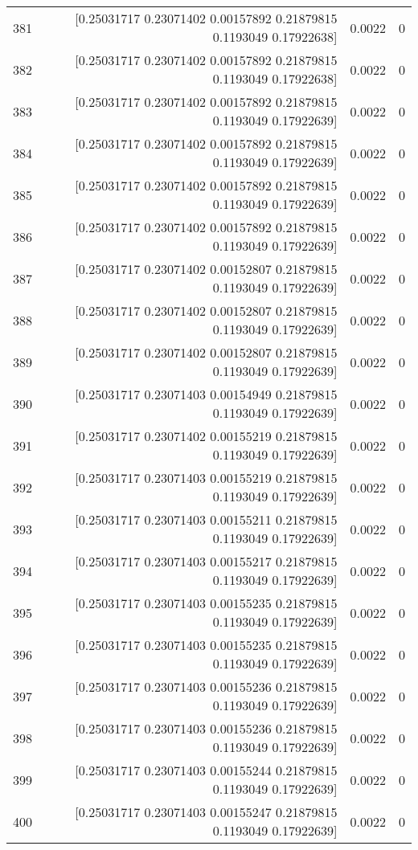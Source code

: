 \begin{longtable}{lrrr}
381 & [0.25031717 0.23071402 0.00157892 0.21879815 0.1193049  0.17922638] & 0.0022 & 0 \\
382 & [0.25031717 0.23071402 0.00157892 0.21879815 0.1193049  0.17922638] & 0.0022 & 0 \\
383 & [0.25031717 0.23071402 0.00157892 0.21879815 0.1193049  0.17922639] & 0.0022 & 0 \\
384 & [0.25031717 0.23071402 0.00157892 0.21879815 0.1193049  0.17922639] & 0.0022 & 0 \\
385 & [0.25031717 0.23071402 0.00157892 0.21879815 0.1193049  0.17922639] & 0.0022 & 0 \\
386 & [0.25031717 0.23071402 0.00157892 0.21879815 0.1193049  0.17922639] & 0.0022 & 0 \\
387 & [0.25031717 0.23071402 0.00152807 0.21879815 0.1193049  0.17922639] & 0.0022 & 0 \\
388 & [0.25031717 0.23071402 0.00152807 0.21879815 0.1193049  0.17922639] & 0.0022 & 0 \\
389 & [0.25031717 0.23071402 0.00152807 0.21879815 0.1193049  0.17922639] & 0.0022 & 0 \\
390 & [0.25031717 0.23071403 0.00154949 0.21879815 0.1193049  0.17922639] & 0.0022 & 0 \\
391 & [0.25031717 0.23071402 0.00155219 0.21879815 0.1193049  0.17922639] & 0.0022 & 0 \\
392 & [0.25031717 0.23071403 0.00155219 0.21879815 0.1193049  0.17922639] & 0.0022 & 0 \\
393 & [0.25031717 0.23071403 0.00155211 0.21879815 0.1193049  0.17922639] & 0.0022 & 0 \\
394 & [0.25031717 0.23071403 0.00155217 0.21879815 0.1193049  0.17922639] & 0.0022 & 0 \\
395 & [0.25031717 0.23071403 0.00155235 0.21879815 0.1193049  0.17922639] & 0.0022 & 0 \\
396 & [0.25031717 0.23071403 0.00155235 0.21879815 0.1193049  0.17922639] & 0.0022 & 0 \\
397 & [0.25031717 0.23071403 0.00155236 0.21879815 0.1193049  0.17922639] & 0.0022 & 0 \\
398 & [0.25031717 0.23071403 0.00155236 0.21879815 0.1193049  0.17922639] & 0.0022 & 0 \\
399 & [0.25031717 0.23071403 0.00155244 0.21879815 0.1193049  0.17922639] & 0.0022 & 0 \\
400 & [0.25031717 0.23071403 0.00155247 0.21879815 0.1193049  0.17922639] & 0.0022 & 0 \\

\end{longtable}
